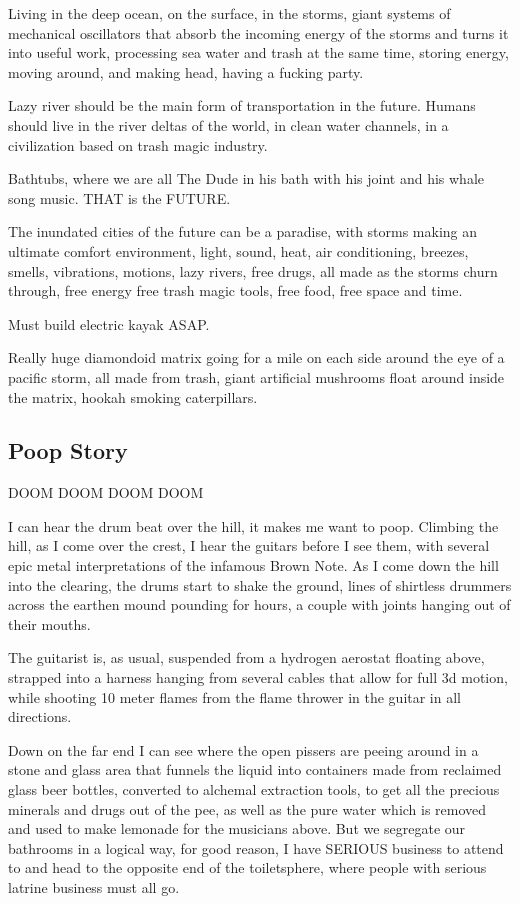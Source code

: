 Living in the deep ocean, on the surface, in the storms, giant systems
of mechanical oscillators that absorb the incoming energy of the storms
and turns it into useful work, processing sea water and trash at the
same time, storing energy, moving around, and making head, having a
fucking party.

Lazy river should be the main form of transportation in the future.
Humans should live in the river deltas of the world, in clean water
channels, in a civilization based on trash magic industry.

Bathtubs, where we are all The Dude in his bath with his joint and his
whale song music. THAT is the FUTURE.

The inundated cities of the future can be a paradise, with storms making
an ultimate comfort environment, light, sound, heat, air conditioning,
breezes, smells, vibrations, motions, lazy rivers, free drugs, all made
as the storms churn through, free energy free trash magic tools, free
food, free space and time.

Must build electric kayak ASAP.

Really huge diamondoid matrix going for a mile on each side around the
eye of a pacific storm, all made from trash, giant artificial mushrooms
float around inside the matrix, hookah smoking caterpillars.

\subsection{Poop Story}\label{poop-story}

DOOM DOOM DOOM DOOM

I can hear the drum beat over the hill, it makes me want to poop.
Climbing the hill, as I come over the crest, I hear the guitars before I
see them, with several epic metal interpretations of the infamous Brown
Note. As I come down the hill into the clearing, the drums start to
shake the ground, lines of shirtless drummers across the earthen mound
pounding for hours, a couple with joints hanging out of their mouths.

The guitarist is, as usual, suspended from a hydrogen aerostat floating
above, strapped into a harness hanging from several cables that allow
for full 3d motion, while shooting 10 meter flames from the flame
thrower in the guitar in all directions.

Down on the far end I can see where the open pissers are peeing around
in a stone and glass area that funnels the liquid into containers made
from reclaimed glass beer bottles, converted to alchemal extraction
tools, to get all the precious minerals and drugs out of the pee, as
well as the pure water which is removed and used to make lemonade for
the musicians above. But we segregate our bathrooms in a logical way,
for good reason, I have SERIOUS business to attend to and head to the
opposite end of the toiletsphere, where people with serious latrine
business must all go.

